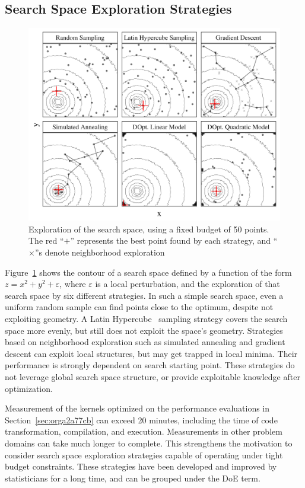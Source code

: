 \documentclass[conference]{IEEEtran}
\begin{document}
\subsection{Search Space Exploration Strategies}
\label{sec:org47485da}
\begin{figure}[b]
\centering
\includegraphics[width=.95\columnwidth]{./img/sampling_comparison.pdf}
\caption{\label{fig:orgc58eb3f}
Exploration of the search space, using a fixed budget of 50 points. The red ``\(+\)'' represents the best point found by each strategy, and ``\(\times\)''s denote neighborhood exploration}
\end{figure}

Figure~\ref{fig:orgc58eb3f} shows the contour of a search space defined
by a function of the form \(z = x^2 + y^2 + \varepsilon\), where \(\varepsilon\) is
a local perturbation, and the exploration of that search space by six different
strategies. In such a simple search space, even a uniform random sample can find
points close to the optimum, despite not exploiting geometry. A Latin
Hypercube~\cite{carnell2018lhs} sampling strategy covers the search space
more evenly, but still does not exploit the space's geometry. Strategies based on
neighborhood exploration such as simulated annealing and gradient descent can
exploit local structures, but may get trapped in local minima. Their
performance is strongly dependent on search starting point. These strategies do
not leverage global search space structure, or provide exploitable knowledge
after optimization.

Measurement of the kernels optimized on the performance evaluations in
Section~\ref{sec:orga2a77cb} can exceed 20 minutes, including the time
of code transformation, compilation, and execution. Measurements in other
problem domains can take much longer to complete. This strengthens the
motivation to consider search space exploration strategies capable of operating
under tight budget constraints. These strategies have been developed and
improved by statisticians for a long time, and can be grouped under the DoE
term.
\end{document}
